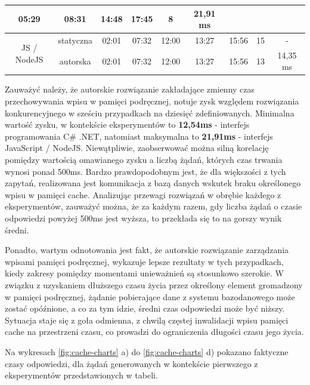\begin{longtable}[c]{|c|c|ccccc|c|c|}
    \multicolumn{1}{c|}{05:29} &
    \multicolumn{1}{c|}{08:31} &
    \multicolumn{1}{c|}{14:48} &
    17:45 &
    8 &
    21,91 ms \\ \hline
  \multirow{2}{*}{JS / NodeJS} &
    statyczna &
    \multicolumn{1}{c|}{02:01} &
    \multicolumn{1}{c|}{07:32} &
    \multicolumn{1}{c|}{12:00} &
    \multicolumn{1}{c|}{13:27} &
    15:56 &
    15 &
    - \\ \cline{2-9} 
   &
    autorska &
    \multicolumn{1}{c|}{02:01} &
    \multicolumn{1}{c|}{07:32} &
    \multicolumn{1}{c|}{12:00} &
    \multicolumn{1}{c|}{13:27} &
    15:56 &
    13 &
    14,35 ms \\ \hline
  \end{longtable}

Zauważyć należy, że autorskie rozwiązanie zakładające zmienny czas przechowywania wpisu w pamięci podręcznej, notuje zysk względem rozwiązania konkurencyjnego w sześciu przypadkach na dziesięć zdefiniowanych. Minimalna wartość zysku, w kontekście eksperymentów to \textbf{12,54ms} - interfejs programowania C\# .NET, natomiast maksymalna to \textbf{21,91ms} - interfejs JavaScript / NodeJS. Niewątpliwie, zaobserwować można silną korelację pomiędzy wartością omawianego zysku a liczbą żądań, których czas trwania wynosi ponad 500ms. Bardzo prawdopodobnym jest, że dla większości z tych zapytań, realizowana jest komunikacja z bazą danych wskutek braku określonego wpisu w pamięci cache. Analizując przewagi rozwiązań w obrębie każdego z eksperymentów, zauważyć można, że za każdym razem, gdy liczba żądań o czasie odpowiedzi powyżej 500ms jest wyższa, to przekłada się to na gorszy wynik średni.

Ponadto, wartym odnotowania jest fakt, że autorskie rozwiązanie zarządzania wpisami pamięci podręcznej, wykazuje lepsze rezultaty w tych przypadkach, kiedy zakresy pomiędzy momentami unieważnień są stosunkowo szerokie. W związku z uzyskaniem dłuższego czasu życia przez określony element gromadzony w pamięci podręcznej, żądanie pobierające dane z systemu bazodanowego może zostać opóźnione, a co za tym idzie, średni czas odpowiedzi może być niższy. Sytuacja staje się z goła odmienna, z chwilą częstej inwalidacji wpisu pamięci cache na przestrzeni czasu, co prowadzi do ograniczenia długości czasu jego życia.

Na wykresach \ref{fig:cache-charts} a) do \ref{fig:cache-charts} d) pokazano faktyczne czasy odpowiedzi, dla żądań generowanych w kontekście pierwszego z eksperymentów przedstawionych w tabeli.

